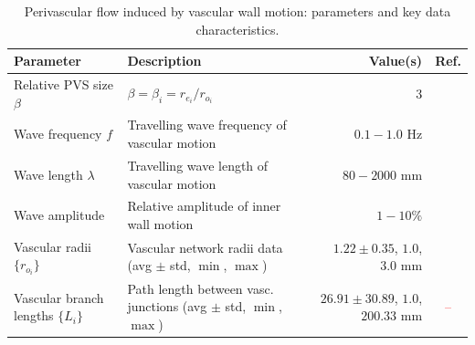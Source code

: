 \documentclass[fleqn,10pt]{wlscirep}
\newcommand{\discuss}[1]{\textcolor{red}{#1}}
\begin{document}
% 
\begin{table}
  \small
  \begin{tabular}{llrc}
    \toprule
    Parameter & Description & Value(s)  & Ref.\\ 
    \midrule
    Relative PVS size $\beta$ & $\beta = \beta_i = r_{e_i} / r_{o_i}$ & 3 & \cite{mestre2018flow} \\
    Wave frequency $f$ & Travelling wave frequency of vascular motion & $0.1-1.0$ Hz & \discuss{\cite{gjerde2023directional}} \\
    Wave length $\lambda$ & Travelling wave length of vascular motion & $80-2000$ mm & \discuss{\cite{gjerde2023directional}} \\
    Wave amplitude & Relative amplitude of inner wall motion & $1-10\%$ & \discuss{\cite{gjerde2023directional}} \\
    Vascular radii $\{r_{o_i}\}$ & Vascular network radii data (avg $\pm$ std, $\min$, $\max$) & $1.22 \pm 0.35$, $1.0$, $3.0$  mm & \cite{hodneland2019new} \\
    Vascular branch lengths $\{L_{i}\}$ & Path length between vasc. junctions (avg $\pm$ std, $\min$, $\max$) & $26.91 \pm 30.89$, $1.0$, $200.33$  mm & \discuss{--} \\
    \bottomrule
  \end{tabular}
  \caption{Perivascular flow induced by vascular wall motion: parameters and key data characteristics.}
  \label{tab:pvs:parameters}
\end{table}
\end{document}

